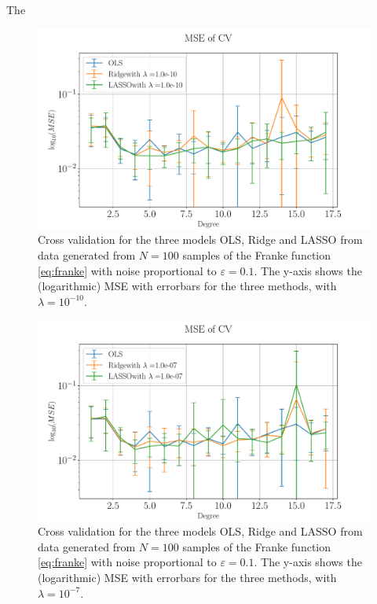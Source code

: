 \documentclass[%
reprint,
amsmath,amssymb,
aps,
pra,
]{revtex4-2}
\begin{document}
The 
\begin{figure}[ht!]
	\centering
	\includegraphics[width=\linewidth]{Python/Figures/CV/CV_0_no_scaling.pdf}
	\caption{Cross validation for the three models OLS, Ridge and LASSO from data generated from \(N=100\) samples of the Franke function \eqref{eq:franke} with noise proportional to \(\varepsilon=0.1\). The y-axis shows the (logarithmic) MSE with errorbars for the three methods, with \(\lambda=10^{-10}\). }
	\label{fig:CV_0}
\end{figure}
\begin{figure}[ht!]
	\centering
	\includegraphics[width=\linewidth]{Python/Figures/CV/CV_1_no_scaling.pdf}
	\caption{Cross validation for the three models OLS, Ridge and LASSO from data generated from \(N=100\) samples of the Franke function \eqref{eq:franke} with noise proportional to \(\varepsilon=0.1\). The y-axis shows the (logarithmic) MSE with errorbars for the three methods, with \(\lambda=10^{-7}\). }
	\label{fig:CV_1}
\end{figure}
\end{document}

